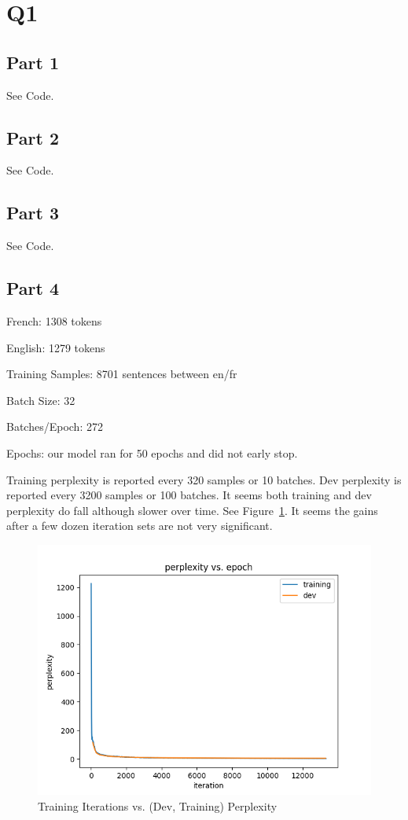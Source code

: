 \documentclass[11pt]{article}
\begin{document}
\section*{Q1}
\subsection*{Part 1}
See Code.

\subsection*{Part 2}
See Code.

\subsection*{Part 3}
See Code.

\subsection*{Part 4}
French: 1308 tokens

\noindent English: 1279 tokens

\noindent Training Samples: 8701 sentences between en/fr

\noindent Batch Size: 32

\noindent Batches/Epoch: 272

\noindent Epochs: our model ran for 50 epochs and did not early stop.

\bigskip

\noindent Training perplexity is reported every 320 samples or 10 batches. Dev perplexity is reported every 3200 samples or 100 batches. It seems both training and dev
perplexity do fall although slower over time. See Figure~\ref{fig:ppl}. It seems the gains after a few dozen iteration sets are not very significant.

\begin{figure}
  \includegraphics[scale=0.5]{pplfigure.png}
  \caption{Training Iterations vs. (Dev, Training) Perplexity}
  \label{fig:ppl}
\end{figure}
\end{document}
